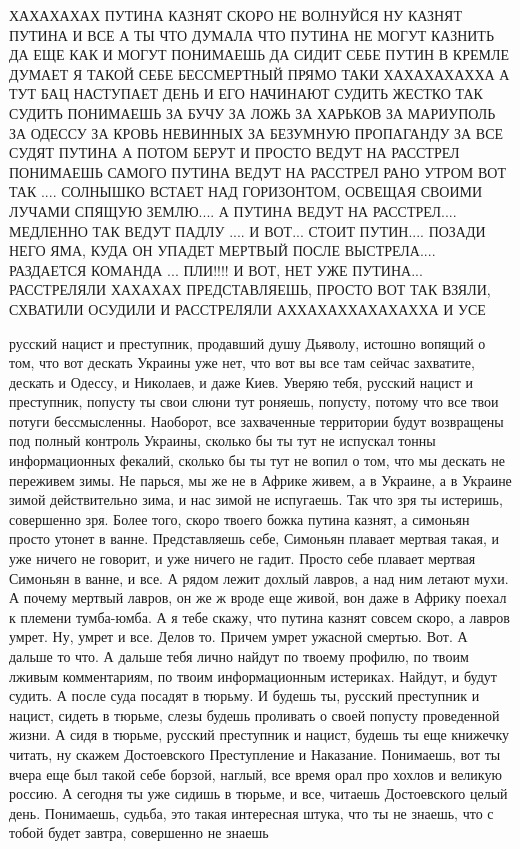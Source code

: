 ХАХАХАХАХ ПУТИНА КАЗНЯТ СКОРО НЕ ВОЛНУЙСЯ НУ КАЗНЯТ ПУТИНА И ВСЕ А ТЫ ЧТО
ДУМАЛА ЧТО ПУТИНА НЕ МОГУТ КАЗНИТЬ ДА ЕЩЕ КАК И МОГУТ ПОНИМАЕШЬ ДА СИДИТ СЕБЕ
ПУТИН В КРЕМЛЕ ДУМАЕТ Я ТАКОЙ СЕБЕ БЕССМЕРТНЫЙ ПРЯМО ТАКИ ХАХАХАХАХХА А ТУТ БАЦ
НАСТУПАЕТ ДЕНЬ И ЕГО НАЧИНАЮТ СУДИТЬ ЖЕСТКО ТАК СУДИТЬ ПОНИМАЕШЬ ЗА БУЧУ ЗА
ЛОЖЬ ЗА ХАРЬКОВ ЗА МАРИУПОЛЬ ЗА ОДЕССУ ЗА КРОВЬ НЕВИННЫХ ЗА БЕЗУМНУЮ ПРОПАГАНДУ
ЗА ВСЕ СУДЯТ ПУТИНА А ПОТОМ БЕРУТ И ПРОСТО ВЕДУТ НА РАССТРЕЛ ПОНИМАЕШЬ САМОГО
ПУТИНА ВЕДУТ НА РАССТРЕЛ РАНО УТРОМ ВОТ ТАК .... СОЛНЫШКО ВСТАЕТ НАД
ГОРИЗОНТОМ, ОСВЕЩАЯ СВОИМИ ЛУЧАМИ СПЯЩУЮ ЗЕМЛЮ.... А ПУТИНА ВЕДУТ НА
РАССТРЕЛ.... МЕДЛЕННО ТАК ВЕДУТ ПАДЛУ .... И ВОТ... СТОИТ ПУТИН.... ПОЗАДИ НЕГО
ЯМА, КУДА ОН УПАДЕТ МЕРТВЫЙ ПОСЛЕ ВЫСТРЕЛА.... РАЗДАЕТСЯ КОМАНДА ... ПЛИ!!!! И
ВОТ, НЕТ УЖЕ ПУТИНА... РАССТРЕЛЯЛИ ХАХАХАХ ПРЕДСТАВЛЯЕШЬ, ПРОСТО ВОТ ТАК ВЗЯЛИ,
СХВАТИЛИ ОСУДИЛИ И РАССТРЕЛЯЛИ АХХАХАХХАХАХАХХА И УСЕ

русский нацист и преступник, продавший душу Дьяволу, истошно вопящий о том, 
что вот дескать Украины уже нет, что вот вы все там сейчас захватите,
дескать и Одессу, и Николаев, и даже Киев. Уверяю тебя, русский нацист и преступник,
попусту ты свои слюни тут роняешь, попусту, потому что все твои потуги бессмысленны.
Наоборот, все захваченные территории будут возвращены под полный контроль Украины,
сколько бы ты тут не испускал тонны информационных фекалий, сколько бы ты тут не вопил о том,
что мы дескать не переживем зимы. Не парься, мы же не в Африке живем, а в Украине,
а в Украине зимой действительно зима, и нас зимой не испугаешь. Так что зря ты истеришь,
совершенно зря. Более того, скоро твоего божка путина казнят, а симоньян просто утонет в ванне.
Представляешь себе, Симоньян плавает мертвая такая, и уже ничего не говорит,
и уже ничего не гадит. Просто себе плавает мертвая Симоньян в ванне, и все. А рядом лежит
дохлый лавров, а над ним летают мухи. А почему мертвый лавров, он же ж вроде
еще живой, вон даже в Африку поехал к племени тумба-юмба. А я тебе скажу, что путина казнят совсем скоро,
а лавров умрет. Ну, умрет и все. Делов то. Причем умрет ужасной смертью. Вот. А дальше то что.
А дальше тебя лично найдут по твоему профилю, по твоим лживым комментариям, по твоим
информационным истериках. Найдут, и будут судить. А после суда посадят в тюрьму. И будешь ты,
русский преступник и нацист, сидеть в тюрьме, слезы будешь проливать о своей попусту проведенной жизни.
А сидя в тюрьме, русский преступник и нацист, будешь ты еще книжечку читать, ну скажем Достоевского
Преступление и Наказание. Понимаешь, вот ты вчера еще был такой себе борзой, наглый, все время орал
про хохлов и великую россию. А сегодня ты уже сидишь в тюрьме, и все, читаешь Достоевского целый день.
Понимаешь, судьба, это такая интересная штука, что ты не знаешь, что с тобой будет завтра, совершенно 
не знаешь

